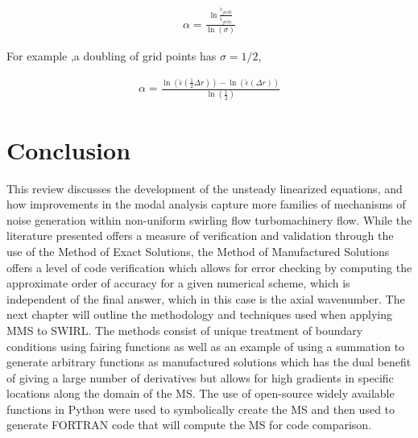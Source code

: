 \begin{align*}
    \alpha = \frac{
        \ln \frac{
            \hat{\epsilon}_{grid 2}
    }{\hat{\epsilon}_{grid 1} }}
    {\ln\left( \sigma \right) }
\end{align*}

For example ,a doubling of grid points has $\sigma=1/2$,

\begin{align*}
    \alpha = \frac{\ln \left( \hat{\epsilon}\left( \frac{1}{2}\Delta  r\right)
            \right) -\ln \left( \hat{\epsilon}\left( \Delta  r\right)
        \right)}{\ln \left( \frac{1}{2} \right)}
    \end{align*}



\section{Conclusion}
This review discusses the development of the unsteady linearized equations, 
and how improvements in the modal analysis capture more families of mechanisms of noise generation within non-uniform 
swirling flow turbomachinery flow. 
While the literature presented offers a measure of verification 
and validation through the use of the Method of Exact Solutions, the Method 
of Manufactured Solutions offers a level of code verification which allows
for error checking by computing the approximate order of accuracy for 
a given numerical scheme, which is independent of the final answer, which
in this case is the axial wavenumber. The next chapter will outline the methodology
and techniques used when applying MMS to SWIRL. The methods consist
of unique treatment of boundary conditions using fairing functions as
well as an example of using a summation to generate arbitrary functions 
as manufactured solutions which has the dual benefit of giving a large
number of derivatives but allows for high gradients in specific locations
along the domain of the MS. The use of open-source widely available functions
in Python were used to symbolically create the MS and then 
used to generate FORTRAN code that will compute the MS for code comparison.  

